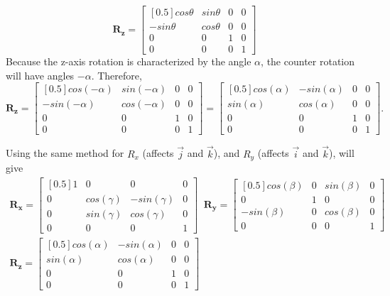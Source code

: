 \documentclass[12pt, letterpaper]{article}
\begin{document}
$$\mathbf{R_z} = \begin{bmatrix}[0.5]cos\theta&sin\theta&0&0\\-sin\theta&cos\theta&0&0\\0&0&1&0\\0&0&0&1 \end{bmatrix}$$
Because the z-axis rotation is characterized by the angle $\alpha$, the counter rotation will have angles $-\alpha$. Therefore,
$$\mathbf{R_z} = \begin{bmatrix}[0.5]cos(-\alpha)&sin(-\alpha)&0&0\\-sin(-\alpha)&cos(-\alpha)&0&0\\0&0&1&0\\0&0&0&1 \end{bmatrix} = \begin{bmatrix}[0.5]cos(\alpha)&-sin(\alpha)&0&0\\sin(\alpha)&cos(\alpha)&0&0\\0&0&1&0\\0&0&0&1 \end{bmatrix}.$$

Using the same method for $R_x$ (affects $\vec{j}$ and $\vec{k}$), and $R_y$ (affects $\vec{i}$ and $\vec{k}$), will give
\begin{equation}
    \begin{gathered}
        \mathbf{R_x} = \begin{bmatrix}[0.5]1&0&0&0\\0&cos(\gamma)&-sin(\gamma)&0\\0&sin(\gamma)&cos(\gamma)&0\\0&0&0&1 \end{bmatrix}\;\;\mathbf{R_y} = \begin{bmatrix}[0.5]cos(\beta)&0&sin(\beta)&0\\0&1&0&0\\-sin(\beta)&0&cos(\beta)&0\\0&0&0&1 \end{bmatrix}\\ 
        \mathbf{R_z} = \begin{bmatrix}[0.5]cos(\alpha)&-sin(\alpha)&0&0\\sin(\alpha)&cos(\alpha)&0&0\\0&0&1&0\\0&0&0&1 \end{bmatrix}
    \end{gathered}
\end{equation}
\end{document}
